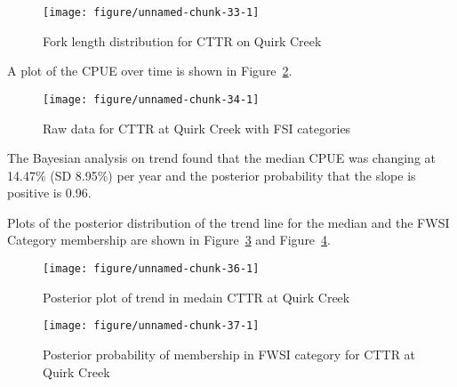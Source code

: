 \documentclass[]{article}\usepackage[]{graphicx}\usepackage[]{color}
\makeatletter
\def\maxwidth{ %
  \ifdim\Gin@nat@width>\linewidth
    \linewidth
  \else
    \Gin@nat@width
  \fi
}
\newenvironment{knitrout}{}{} %
\makeatother
\begin{document}
\begin{figure}[h]
\begin{center}
\begin{knitrout}
\color{fgcolor}
\texttt{[image: figure/unnamed-chunk-33-1]} 

\end{knitrout}
\end{center}
\caption{Fork length distribution for CTTR on Quirk Creek}
\label{fig:ldistCTTR}
\end{figure}


A plot of the CPUE over time is shown in Figure~\ref{fig:rawtrendCTTR}.

\begin{figure}[h]
\begin{center}
\begin{knitrout}
\color{fgcolor}
\texttt{[image: figure/unnamed-chunk-34-1]} 

\end{knitrout}
\end{center}
\caption{Raw data for CTTR at Quirk Creek with FSI categories}
\label{fig:rawtrendCTTR}
\end{figure}




The Bayesian analysis on trend found that the median CPUE was changing at 
14.47\% (SD  8.95\%) per year
and the posterior probability that the slope is positive is  0.96.

Plots of the posterior distribution of the trend line for the median and the FWSI Category membership are shown in 
Figure~\ref{fig:postplotCTTR} and
Figure~\ref{fig:fsiplotCTTR}.

\begin{figure}[h]
\begin{center}
\begin{knitrout}
\color{fgcolor}
\texttt{[image: figure/unnamed-chunk-36-1]} 

\end{knitrout}
\end{center}
\caption{Posterior plot of trend in medain CTTR at Quirk Creek}
\label{fig:postplotCTTR}
\end{figure}

\begin{figure}[h]
\begin{center}
\begin{knitrout}
\color{fgcolor}
\texttt{[image: figure/unnamed-chunk-37-1]} 

\end{knitrout}
\end{center}
\caption{Posterior probability of membership in FWSI category for  CTTR at Quirk Creek}
\label{fig:fsiplotCTTR}
\end{figure}
\end{document}
